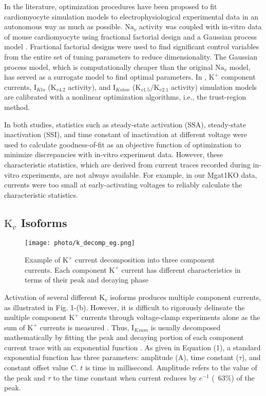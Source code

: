\documentclass[journal]{IEEEtran}
\begin{document}
In the literature, optimization procedures have been proposed to fit cardiomyocyte simulation models to electrophysiological experimental data in an autonomous way as much as possible. $\text{Na}_{v}$ activity was coupled with in-vitro data of mouse cardiomyocyte using fractional factorial design and a Gaussian process model \cite{du2015statistical}. Fractional factorial designs were used to find significant control variables from the entire set of tuning parameters to reduce dimensionality. The Gaussian process model, which is computationally cheaper than the original $\text{Na}_{v}$ model, has served as a surrogate model to find optimal parameters. In \cite{du2017}, $\text{K}^{+}$ component currents, $\text{I}_{Kto}$ ($\text{K}_{v4.2}$ activity), and $\text{I}_{Kslow}$ ($\text{K}_{v1.5}/\text{K}_{v2.1}$ activity) simulation models are calibrated with a nonlinear optimization algorithms, i.e., the trust-region method. 

In both studies, statistics such as steady-state activation (SSA), steady-state inactivation (SSI), and time constant of inactivation at different voltage were used to calculate goodness-of-fit as an objective function of optimization to minimize discrepancies with in-vitro experiment data. However, these characteristic statistics, which are derived from current traces recorded during in-vitro experiments, are not always available. For example, in our Mgat1KO data, currents were too small at early-activating voltages to reliably calculate the characteristic statistics.  

\subsection{$\text{K}_{v}$ Isoforms}
\begin{figure}
    \label{fig3}
    \centering
    \texttt{[image: photo/k\_decomp\_eg.png]}
    \caption{Example of $\text{K}^{+}$ current decomposition into three component currents. Each component $\text{K}^{+}$ current has different characteristics in terms of their peak and decaying phase}
\end{figure}
Activation of several different $\text{K}_{v}$ isoforms produces multiple component currents, as illustrated in Fig. 1-(b). However, it is difficult to rigorously delineate the multiple component $\text{K}^{+}$ currents through voltage-clamp experiments alone as the sum of $\text{K}^{+}$ currents is measured \cite{brouillette2004functional}. Thus, $\text{I}_{Ksum}$ is usually decomposed mathematically by fitting the peak and decaying portion of each component current trace with an exponential function \cite{brunet2004heterogeneous}. As given in Equation (1), a standard exponential function has three parameters: amplitude ($\text{A}$), time constant ($\tau$), and constant offset value $\text{C}$. $t$ is time in millisecond. Amplitude refers to the value of the peak and $\tau$ to the time constant when current reduces by $e^{-1}$ (~63\%) of the peak. 
\end{document}
